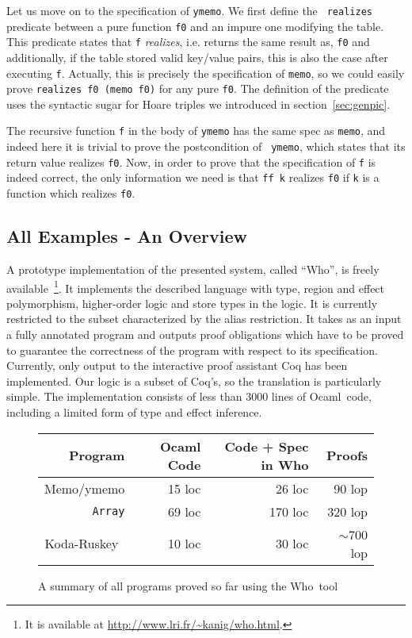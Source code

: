 \documentclass[a4paper]{llncs}
\newcommand{\who}{Who}
\newcommand{\ocaml}{Ocaml}
\begin{document}
Let us move on to the specification of {\tt ymemo}. We first define the {\tt
realizes} predicate between a pure function {\tt f0} and an impure one
modifying the table. This predicate states that {\tt f} {\em realizes}, i.e.
returns the same result as, {\tt f0} and additionally, if the table stored
valid key/value pairs, this is also the case after executing {\tt f}.
Actually, this is precisely the specification of {\tt memo}, so we could
easily prove {\tt realizes f0~(memo f0)} for any pure {\tt f0}. The definition
of the predicate uses the syntactic sugar for Hoare triples we introduced in
section~\ref{sec:genpic}. 

The recursive function {\tt f} in the body of {\tt ymemo} has the same spec as
{\tt memo}, and indeed here it is trivial to prove the postcondition of {\tt
ymemo}, which states that its return value realizes {\tt f0}. Now, in order to
prove that the specification of {\tt f} is indeed correct, the only
information we need is that {\tt ff k} realizes {\tt f0} if {\tt k} is a
function which realizes {\tt f0}.

\subsection{All Examples - An Overview}

A prototype implementation of the presented system, called ``\who'', is freely
available~\cite{KanigFilliatre09wml}\footnote{It is available at
\url{http://www.lri.fr/~kanig/who.html}.}. It implements the described
language with type, region and effect polymorphism, higher-order logic and
store types in the logic. It is currently restricted to the subset
characterized by the alias restriction. It takes as an input a fully annotated
program and outputs proof obligations which have to be proved to guarantee the
correctness of the program with respect to its specification. Currently, only
output to the interactive proof assistant Coq has been implemented. Our logic
is a subset of Coq's, so the translation is particularly simple.  The
implementation consists of less than 3000 lines of \ocaml\ code, including a
limited form of type and effect inference.

\begin{figure}[tbp]
\begin{center}
    \begin{tabular}{ | r | r | r | r |}
    \hline
    Program & Ocaml Code & Code + Spec in \who & Proofs \\ \hline
    Memo/ymemo & 15 loc & 26 loc & 90 lop  \\ \hline
    {\tt Array} & 69 loc & 170 loc  & 320 lop  \\ \hline
    Koda-Ruskey~\cite{KanigFilliatre09wml} & 10 loc & 30 loc & $\sim$700 lop  \\ \hline
    \end{tabular}
\end{center}
  \caption{A summary of all programs proved so far using the \who\ tool}
  \label{fig:whoproofs}
\end{figure}
\end{document}

